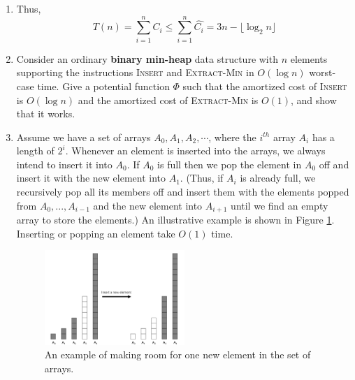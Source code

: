 \documentclass[12pt,a4paper]{article}
\makeatletter
\newtheorem*{solution}{Solution}
\theoremstyle{definition}
\renewenvironment{solution}[1][Solution] {\par\pushQED{\qed}\normalfont\topsep6\p@\@plus6\p@\relax\trivlist\item[\hskip\labelsep\bfseries#1\@addpunct{.}]\ignorespaces}{\popQED\endtrivlist\@endpefalse} \makeatother
\makeatother
\begin{document}
\begin{enumerate}
\begin{solution}
\begin{description}
		\end{description}

		\begin{figure}[h]
			\centering
			
		\end{figure}
	
		Thus,
		\begin{equation*}
			T(n) = \sum_{i=1}^n C_i \leq \sum_{i=1}^n \hat{C_i} = 3n - \lfloor \log_2 n \rfloor
		\end{equation*}
	\end{solution}

	\item Consider an ordinary \textbf{binary min-heap} data structure with $n$ elements supporting the instructions \textsc{Insert} and \textsc{Extract-Min} in $O(\log n)$ worst-case time. Give a potential function $\Phi$ such that the amortized cost of \textsc{Insert} is $O(\log n)$ and the amortized cost of \textsc{Extract-Min} is $O(1)$, and show that it works.
	
	
	\item Assume we have a set of arrays $A_0, A_1, A_2,\cdots$, where the $i^{th}$ array $A_i$ has a length of $2^i$. Whenever an element is inserted into the arrays, we always intend to insert it into $A_0$. If $A_0$ is full then we pop the element in $A_0$ off and insert it with the new element into $A_{1}$. (Thus, if $A_{i}$ is already full, we recursively pop all its members off and insert them with the elements popped from $A_0,...,A_{i-1}$ and the new element into $A_{i+1}$ until we find an empty array to store the elements.) An illustrative example is shown in Figure \ref{Fig-MultiArray}. Inserting or popping an element take $O(1)$ time.

	\begin{figure}[!htbp]
	\centering
	\includegraphics[width=0.5\textwidth]{Fig-MultiArray.pdf}
	\caption{An example of making room for one new element in the set of arrays.}
	\label{Fig-MultiArray}
	\end{figure}


\end{enumerate}
\end{document}
